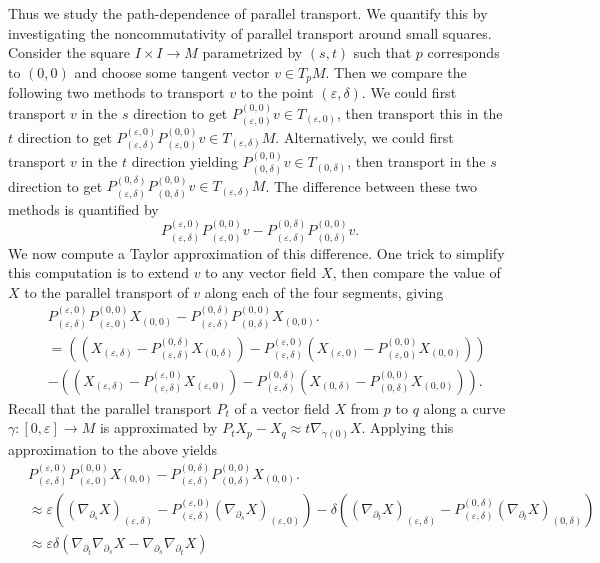 \documentclass[
]{article}
\begin{document}
Thus we study the path-dependence of parallel transport. We quantify
this by investigating the noncommutativity of parallel transport around
small squares. Consider the square \(I \times I \to M\) parametrized by
\((s,t)\) such that \(p\) corresponds to \((0,0)\) and choose some
tangent vector \(v \in T_p M\). Then we compare the following two
methods to transport \(v\) to the point \((\varepsilon, \delta)\). We
could first transport \(v\) in the \(s\) direction to get
\(P^{(0,0)}_{(\varepsilon,0)}v \in T_{(\varepsilon,0)}\), then transport
this in the \(t\) direction to get
\(P_{(\varepsilon,\delta)}^{(\varepsilon,0)}P^{(0,0)}_{(\varepsilon,0)}v \in T_{(\varepsilon,\delta)}M\).
Alternatively, we could first transport \(v\) in the \(t\) direction
yielding \(P^{(0,0)}_{(0,\delta)}v \in T_{(0,\delta)}\), then transport
in the \(s\) direction to get
\(P_{(\varepsilon,\delta)}^{(0,\delta)}P^{(0,0)}_{(0,\delta)}v \in T_{(\varepsilon,\delta)}M\).
The difference between these two methods is quantified by \[
    P_{(\varepsilon,\delta)}^{(\varepsilon,0)} P_{(\varepsilon,0)}^{(0,0)} v - P_{(\varepsilon,\delta)}^{(0,\delta)} P_{(0,\delta)}^{(0,0)} v.
\] We now compute a Taylor approximation of this difference. One trick
to simplify this computation is to extend \(v\) to any vector field
\(X\), then compare the value of \(X\) to the parallel transport of
\(v\) along each of the four segments, giving \begin{align}
    &P_{(\varepsilon,\delta)}^{(\varepsilon,0)} P_{(\varepsilon,0)}^{(0,0)} X_{(0,0)} - P_{(\varepsilon,\delta)}^{(0,\delta)} P_{(0,\delta)}^{(0,0)} X_{(0,0)}.\\\
    &= ((X_{(\varepsilon,\delta)} - P_{(\varepsilon,\delta)}^{(0,\delta)}X_{(0,\delta)})
    - P_{(\varepsilon,\delta)}^{(\varepsilon,0)}(X_{(\varepsilon,0)} - P_{(\varepsilon,0)}^{(0,0)}X_{(0,0)}))\\\
    &- ((X_{(\varepsilon,\delta)} - P_{(\varepsilon,\delta)}^{(\varepsilon,0)}X_{(\varepsilon,0)})
    - P_{(\varepsilon,\delta)}^{(0,\delta)}(X_{(0,\delta)} - P_{(0,\delta)}^{(0,0)}X_{(0,0)})).
\end{align} Recall that the parallel transport \(P_t\) of a vector field
\(X\) from \(p\) to \(q\) along a curve
\(\gamma: [0, \varepsilon] \to M\) is approximated by
\(P_t X_p - X_q \approx t \nabla_{\dot{\gamma}(0)}X\). Applying this
approximation to the above yields \begin{align}
    &P_{(\varepsilon,\delta)}^{(\varepsilon,0)} P_{(\varepsilon,0)}^{(0,0)} X_{(0,0)} - P_{(\varepsilon,\delta)}^{(0,\delta)} P_{(0,\delta)}^{(0,0)} X_{(0,0)}.\\\
    &\approx \varepsilon((\nabla_{\partial_s}X)_{(\varepsilon, \delta)} 
    - P_{(\varepsilon,\delta)}^{(\varepsilon,0)}(\nabla_{\partial_s}X)_{(\varepsilon, 0)})
    - \delta((\nabla_{\partial_t}X)_{(\varepsilon, \delta)} 
    - P_{(\varepsilon,\delta)}^{(0, \delta)}(\nabla_{\partial_t}X)_{(0, \delta)}) \\\
    &\approx \varepsilon\delta (\nabla_{\partial_t}\nabla_{\partial_s} X - \nabla_{\partial_s}\nabla_{\partial_t} X)
\end{align}
\end{document}
